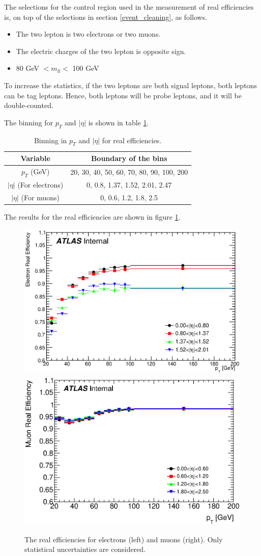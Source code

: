 The selections for the control region used in the measurement of real efficiencies is, on top of the selections in section \ref{event_cleaning}, as follows.
\begin{itemize}
\item The two lepton is two electrons or two muons.
\item The electric charges of the two lepton is opposite sign.
\item 80 GeV $< m_{ll} <$ 100 GeV
\end{itemize}

To increase the statistics, if the two leptons are both signal leptons, both leptons can be tag leptons.
Hence, both leptons will be probe leptons, and it will be double-counted.

The binning for $p_T$ and $|\eta|$ is shown in table \ref{tab:binning_real_eff}.
\begin{table}[htbp]
\centering
\begin{tabular}{|c|c|}
\hline
Variable & Boundary of the bins \\
\hline
$p_T$ (GeV) &  20, 30, 40, 50, 60, 70, 80, 90, 100, 200 \\
\hline
$|\eta|$ (For electrons) & 0, 0.8, 1.37, 1.52, 2.01, 2.47 \\
\hline
$|\eta|$ (For muons) & 0, 0.6, 1.2, 1.8, 2.5 \\
\hline
\end{tabular}
\caption{Binning in $p_T$ and $|\eta|$ for real efficiencies.}
\label{tab:binning_real_eff}
\end{table}

The results for the real efficiencies are shown in figure \ref{fig:result_real_eff}.
\begin{figure}[htpb]
\centering
\includegraphics[width=0.49\linewidth]{data/plot/plotRealEffs/El_hEff.eps}
\includegraphics[width=0.49\linewidth]{data/plot/plotRealEffs/Mu_hEff.eps}
\caption{The real efficiencies for electrons (left) and muons (right). Only statistical uncertainties are considered.}
\label{fig:result_real_eff}
\end{figure}

